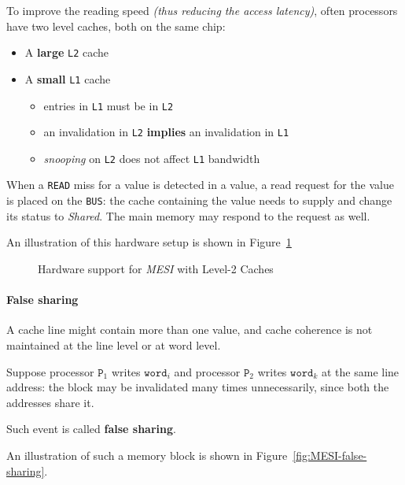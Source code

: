 \documentclass[english]{article}
\begin{document}
To improve the reading speed \textit{(thus reducing the access latency)}, often processors have two level caches, both on the same chip:

\begin{itemize}
  \item A \textbf{large} \texttt{L2} cache
  \item A \textbf{small} \texttt{L1} cache
        \begin{itemize}
          \item entries in \texttt{L1} must be in \texttt{L2}
          \item an invalidation in \texttt{L2} \textbf{implies} an invalidation in \texttt{L1}
          \item \textit{snooping} on \texttt{L2} does not affect \texttt{L1} bandwidth
        \end{itemize}
\end{itemize}

When a \texttt{READ} miss for a value is detected in a value, a read request for the value is placed on the \texttt{BUS}:
the cache containing the value needs to supply and change its status to \textit{Shared}.
The main memory may respond to the request as well.

\bigskip
An illustration of this hardware setup is shown in Figure~\ref{fig:MESI-bus-rd-level-2}

\begin{figure}[htbp]
  \centering
  \bigskip
  \caption{Hardware support for \textit{MESI} with Level-2 Caches}
  \label{fig:MESI-bus-rd-level-2}
  \bigskip
\end{figure}

\paragraph{False sharing}

A cache line might contain more than one value, and cache coherence is not maintained at the line level or at word level.

Suppose processor \(\texttt{P}_1\) writes \(\texttt{word}_i\) and processor \(\texttt{P}_2\) writes \(\texttt{word}_k\) at the same line address:
the block may be invalidated many times unnecessarily, since both the addresses share it.

Such event is called \textbf{false sharing}.

\bigskip
An illustration of such a memory block is shown in Figure~\ref{fig:MESI-false-sharing}.
\end{document}
